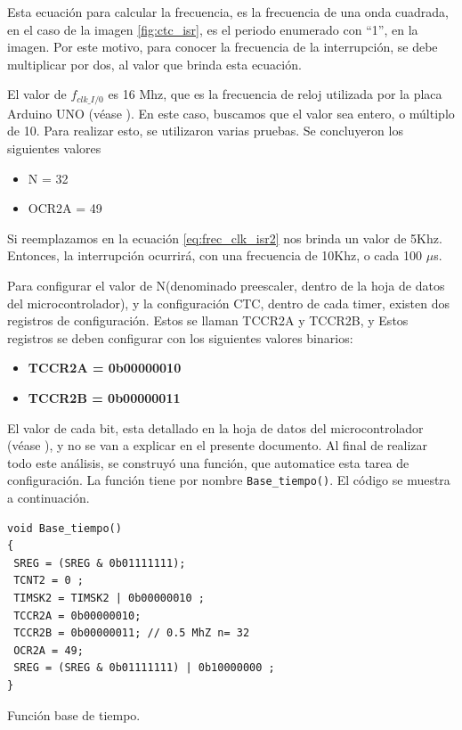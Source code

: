 Esta ecuación para calcular la frecuencia, es la frecuencia de una onda cuadrada, en el caso de la imagen \ref{fig:ctc_isr}, es el periodo enumerado con ``1'', en la imagen. Por este motivo, para conocer la frecuencia de la interrupción, se debe multiplicar por dos, al valor que brinda esta ecuación. 


El valor de $f_{clk \_ I/0}$ es 16 Mhz, que es la frecuencia de reloj utilizada por la placa Arduino UNO (véase \cite{arduno}). En este caso, buscamos que el valor sea entero, o múltiplo de 10. Para realizar esto, se utilizaron varias pruebas. Se concluyeron los siguientes valores
\begin{itemize}
	\item N = 32
	\item OCR2A = 49
\end{itemize}

Si reemplazamos en la ecuación \ref{eq:frec_clk_isr2} nos brinda un valor de 5Khz. Entonces, la interrupción ocurrirá, con una frecuencia de 10Khz, o cada 100 $\mu$s. 

Para configurar el valor de N(denominado preescaler, dentro de la hoja de datos del microcontrolador), y la configuración CTC, dentro de cada timer, existen dos registros de configuración. 
Estos se llaman TCCR2A y TCCR2B, y 
Estos registros se deben configurar con los siguientes valores binarios: 
\begin{itemize}
	\item \textbf{TCCR2A = 0b00000010} 
	\item \textbf{TCCR2B = 0b00000011} 
\end{itemize} 

El valor de cada bit, esta detallado en la hoja de datos del microcontrolador (véase \cite{ATmega328P}), y no se van a explicar en el presente documento. Al final de realizar todo este análisis, se construyó una función, que automatice esta tarea de configuración. La función tiene por nombre \texttt{Base_tiempo()}. El código se muestra a continuación. 

\begin{listing}[ht]
	\begin{verbatim}
void Base_tiempo()
{
 SREG = (SREG & 0b01111111);
 TCNT2 = 0 ;
 TIMSK2 = TIMSK2 | 0b00000010 ;
 TCCR2A = 0b00000010;
 TCCR2B = 0b00000011; // 0.5 MhZ n= 32 
 OCR2A = 49;
 SREG = (SREG & 0b01111111) | 0b10000000 ;
}	
	\end{verbatim}
\caption{Función base de tiempo.}
\label{cod:base_tiempo}
\end{listing}

